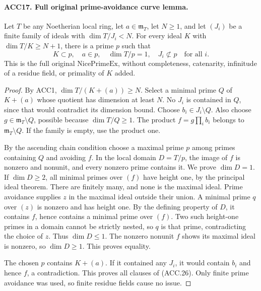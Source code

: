 \paragraph{ACC17. Full original prime-avoidance curve lemma.}
\label{claim:ACC17}
Let \(T\) be any Noetherian local ring, let \(a\in\mathfrak m_T\),
let \(N\ge1\), and let \((J_i)\) be a finite family of ideals
with \(\dim T/J_i<N\).  For every ideal \(K\) with
\(\dim T/K\ge N+1\), there is a prime \(p\) such that
\[
 K\subset p,\quad a\in p,\quad \dim T/p=1,
                     \quad J_i\not\subset p\quad\text{for all }i.
                                                               \tag{ACC.26}
\]
This is the full original \(\mathrm{NicePrimeEx}\), without
completeness, catenarity, infinitude of a residue field, or primality
of \(K\) added.

\begin{proof}
By ACC1, \(\dim T/(K+(a))\ge N\).  Select a minimal prime
\(Q\) of \(K+(a)\) whose quotient has dimension at least \(N\).
No \(J_i\) is contained in \(Q\), since that would contradict
its dimension bound.  Choose \(b_i\in J_i\setminus Q\).
Also choose \(g\in\mathfrak m_T\setminus Q\), possible because
\(\dim T/Q\ge1\).  The product \(f=g\prod_i b_i\) belongs
to \(\mathfrak m_T\setminus Q\).  If the family is empty, use
the product one.

By the ascending chain condition choose a maximal prime \(p\)
among primes containing \(Q\) and avoiding \(f\).  In the local
domain \(D=T/p\), the image of \(f\) is nonzero and nonunit,
and every nonzero prime contains it.  We prove \(\dim D=1\).
If \(\dim D\ge2\), all minimal primes over \((f)\) have
height one, by the principal ideal theorem.  There are finitely
many, and none is the maximal ideal.  Prime avoidance supplies
\(z\) in the maximal ideal outside their union.  A minimal prime
\(q\) over \((z)\) is nonzero and has height one.  By the
defining property of \(D\), it contains \(f\), hence contains
a minimal prime over \((f)\).  Two such height-one primes in
a domain cannot be strictly nested, so \(q\) is that prime,
contradicting the choice of \(z\).  Thus \(\dim D\le1\).
The nonzero nonunit \(f\) shows its maximal ideal is nonzero,
so \(\dim D\ge1\).  This proves equality.

The chosen \(p\) contains \(K+(a)\).  If it contained any
\(J_i\), it would contain \(b_i\) and hence \(f\), a
contradiction.  This proves all clauses of (ACC.26).  Only finite
prime avoidance was used, so finite residue fields cause no issue.
\end{proof}

